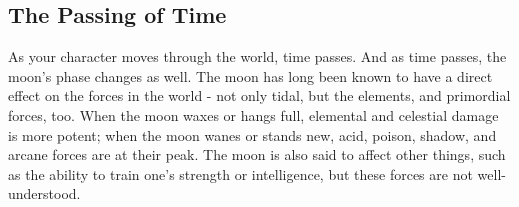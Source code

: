 \subsection{The Passing of Time}

As your character moves through the world, time passes.  And as time
passes, the moon's phase changes as well.  The moon has long been known to
have a direct effect on the forces in the world - not only tidal, but the
elements, and primordial forces, too.  When the moon waxes or hangs full, 
elemental and celestial damage is more potent; when the moon wanes or
stands new, acid, poison, shadow, and arcane forces are at their peak.
The moon is also said to affect other things, such as the ability to train
one's strength or intelligence, but these forces are not well-understood.

